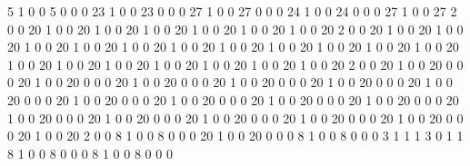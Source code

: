 5
1
0
0
5
0
0
0
23
1
0
0
23
0
0
0
27
1
0
0
27
0
0
0
24
1
0
0
24
0
0
0
27
1
0
0
27
2
0
0
20
1
0
0
20
1
0
0
20
1
0
0
20
1
0
0
20
1
0
0
20
1
0
0
20
2
0
0
20
1
0
0
20
1
0
0
20
1
0
0
20
1
0
0
20
1
0
0
20
1
0
0
20
1
0
0
20
1
0
0
20
1
0
0
20
1
0
0
20
1
0
0
20
1
0
0
20
1
0
0
20
1
0
0
20
1
0
0
20
1
0
0
20
1
0
0
20
1
0
0
20
2
0
0
20
1
0
0
20
0
0
0
20
1
0
0
20
0
0
0
20
1
0
0
20
0
0
0
20
1
0
0
20
0
0
0
20
1
0
0
20
0
0
0
20
1
0
0
20
0
0
0
20
1
0
0
20
0
0
0
20
1
0
0
20
0
0
0
20
1
0
0
20
0
0
0
20
1
0
0
20
0
0
0
20
1
0
0
20
0
0
0
20
1
0
0
20
0
0
0
20
1
0
0
20
0
0
0
20
1
0
0
20
0
0
0
20
1
0
0
20
0
0
0
20
1
0
0
20
2
0
0
8
1
0
0
8
0
0
0
20
1
0
0
20
0
0
0
8
1
0
0
8
0
0
0
3
1
1
1
3
0
1
1
8
1
0
0
8
0
0
0
8
1
0
0
8
0
0
0
